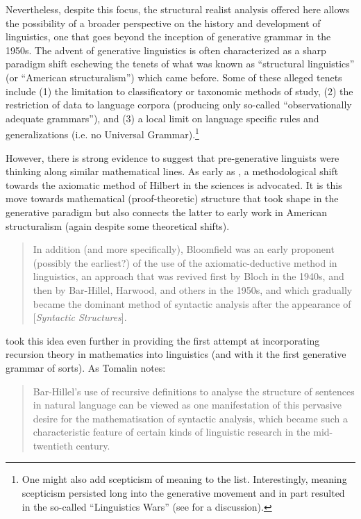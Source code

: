 \documentclass[output=paper]{langscibook}
\begin{document}
Nevertheless, despite this focus, the structural realist analysis offered here allows the possibility of a broader perspective on the history and development of linguistics, one that goes beyond the inception of generative grammar in the 1950s. The advent of generative linguistics is often characterized as a sharp paradigm shift eschewing the tenets of what was known as ``structural linguistics'' (or ``American structuralism'') which came before. Some of these alleged tenets include (1) the limitation to classificatory or taxonomic methods of study, (2) the restriction of data to language corpora (producing only so-called ``observationally adequate grammars''), and (3) a local limit on language specific rules and generalizations (i.e. no Universal Grammar).\footnote{One might also add scepticism of meaning to the list. Interestingly, meaning scepticism persisted long into the generative movement and in part resulted in the so-called ``Linguistics Wars'' (see \citealt{Newmeyer1996} for a discussion).}

However, there is strong evidence to suggest that pre-generative linguists were thinking along similar mathematical lines. As early as \cite{Bloomfield1926}, a methodological shift towards the axiomatic method of Hilbert in the sciences is advocated. It is this move towards mathematical (proof-theoretic) structure that took shape in the generative paradigm but also connects the latter to early work in American structuralism (again despite some theoretical shifts).

\begin{quote}
    In addition (and more specifically), Bloomfield was an early proponent (possibly the earliest?) of the use of the axiomatic-deductive method in linguistics, an approach that was revived first by Bloch in the 1940s, and then by Bar-Hillel, Harwood, and others in the 1950s, and which gradually became the dominant method of syntactic analysis after the appearance of [\emph{Syntactic Structures}]. \citep[184]{Tomalin2006}
\end{quote}


\cite{Bar-Hillel1953} took this idea even further in providing the first attempt at incorporating recursion theory in mathematics into linguistics (and with it the first generative grammar of sorts). As Tomalin notes:

\begin{quote}
    Bar-Hillel's use of recursive definitions to analyse the structure of sentences in natural language can be viewed as one manifestation of this pervasive desire for the mathematisation of syntactic analysis, which became such a characteristic feature of certain kinds of linguistic research in the mid-twentieth century. \citep[67]{Tomalin2006}
\end{quote}
\end{document}
